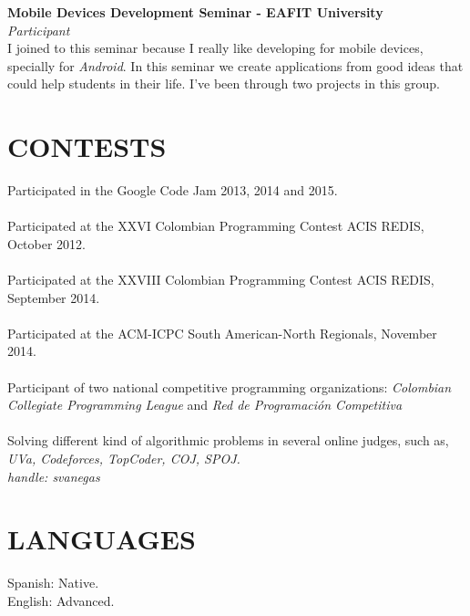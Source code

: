 \documentclass[margin, 10pt]{res} %
\begin{document}
\begin{resume}
\textbf{Mobile Devices Development Seminar - EAFIT University} \\
\textit{Participant} \\
I joined to this seminar because I really like developing for mobile devices, specially for
\emph{Android}. In this seminar we create applications from good ideas that could help
students in their life. I've been through two projects in this group.


\section{CONTESTS}
Participated in the Google Code Jam 2013, 2014 and 2015. \\ \\
Participated at the XXVI Colombian Programming Contest ACIS REDIS, October 2012. \\  \\
Participated at the XXVIII Colombian Programming Contest ACIS REDIS, September 2014. \\ \\
Participated at the ACM-ICPC South American-North Regionals, November 2014. \\ \\
Participant of two national competitive programming organizations: \emph{Colombian Collegiate
Programming League} and \emph{Red de Programación Competitiva}\\ \\
Solving different kind of algorithmic problems in several online judges, such as,
{\sl UVa, Codeforces, TopCoder, COJ, SPOJ.}\\ {\sl handle: svanegas} \\


\section{LANGUAGES}
Spanish: Native. \\
English: Advanced.

\end{resume}
\end{document}
